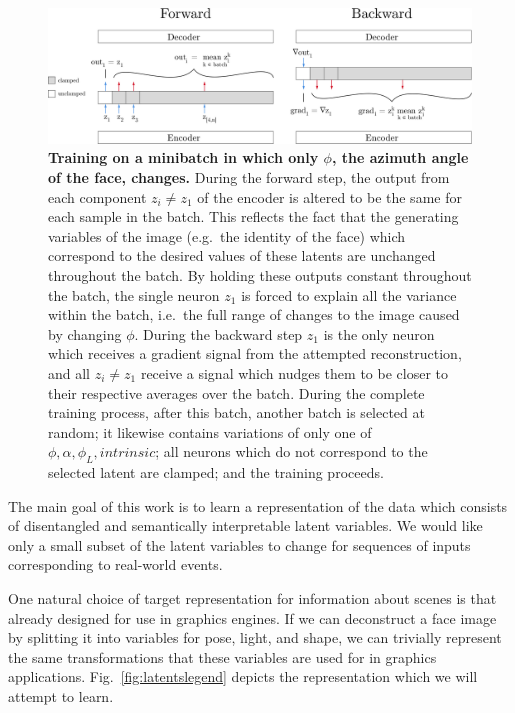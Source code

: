\documentclass[12pt,twoside]{mitthesis}
\begin{document}
\begin{figure}[htbp]
\centering
\includegraphics{figures/remastered_training_diagram.pdf}
\caption{\label{fig:selectivetraining}\textbf{Training on a minibatch in
which only $\phi$, the azimuth angle of the face, changes.} During the
forward step, the output from each component $z_i \neq z_1$ of the
encoder is altered to be the same for each sample in the batch. This
reflects the fact that the generating variables of the image (e.g.~the
identity of the face) which correspond to the desired values of these
latents are unchanged throughout the batch. By holding these outputs
constant throughout the batch, the single neuron $z_1$ is forced to
explain all the variance within the batch, i.e.~the full range of
changes to the image caused by changing $\phi$. During the backward
step $z_1$ is the only neuron which receives a gradient signal from
the attempted reconstruction, and all $z_i \neq z_1$ receive a signal
which nudges them to be closer to their respective averages over the
batch. During the complete training process, after this batch, another
batch is selected at random; it likewise contains variations of only one
of ${\phi, \alpha, \phi_L, intrinsic}$; all neurons which do not
correspond to the selected latent are clamped; and the training
proceeds.}
\end{figure}

The main goal of this work is to learn a representation of the data
which consists of disentangled and semantically interpretable latent
variables. We would like only a small subset of the latent variables to
change for sequences of inputs corresponding to real-world events.

One natural choice of target representation for information about scenes
is that already designed for use in graphics engines. If we can
deconstruct a face image by splitting it into variables for pose, light,
and shape, we can trivially represent the same transformations that
these variables are used for in graphics applications.
Fig.~\ref{fig:latentslegend} depicts the representation which we will
attempt to learn.
\end{document}
